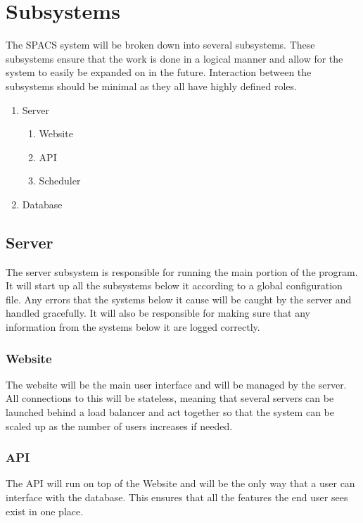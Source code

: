 \section{Subsystems}

\par
The SPACS system will be broken down into several subsystems. These subsystems ensure that the work is done in a logical manner and allow for the system to easily be expanded on in the future. Interaction between the subsystems should be minimal as they all have highly defined roles.

\par
\begin{enumerate}
	\item Server
	\begin{enumerate}
		\item Website
		\item API
		\item Scheduler
	\end{enumerate}
	\item Database
\end{enumerate}

\subsection{Server}
\par
The server subsystem is responsible for running the main portion of the program. It will start up all the subsystems below it according to a global configuration file. Any errors that the systems below it cause will be caught by the server and handled gracefully. It will also be responsible for making sure that any information from the systems below it are logged correctly.

\subsubsection{Website}
\par
The website will be the main user interface and will be managed by the server. All connections to this will be stateless, meaning that several servers can be launched behind a load balancer and act together so that the system can be scaled up as the number of users increases if needed.

\subsubsection{API}
\par
The API will run on top of the Website and will be the only way that a user can interface with the database. This ensures that all the features the end user sees exist in one place.

